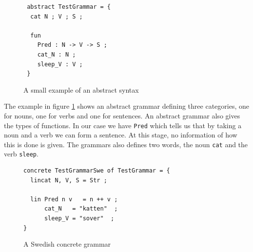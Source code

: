 \documentclass{report}
\begin{document}
\begin{figure}[h]
\begin{verbatim}
 abstract TestGrammar = {
  cat N ; V ; S ;

  fun 
    Pred : N -> V -> S ;
    cat_N : N ;
    sleep_V : V ;
 }
\end{verbatim}
\caption{A small example of an abstract syntax}
\label{fig:gfAbstract1}
\end{figure}

The example in figure \ref{fig:gfAbstract1} shows an abstract grammar defining three categories, %
one for nouns, one for verbs and one for sentences. An abstract grammar also gives
the types of functions. In our case we have \verb|Pred| which
tells us that by taking a noun and a verb we can form a sentence. At this stage, 
no information of how this is done is given. The grammars also defines two words,
the noun \verb|cat| and the verb \verb|sleep|. 

\begin{figure}[h]
\begin{verbatim}
concrete TestGrammarSwe of TestGrammar = {
  lincat N, V, S = Str ;
   
  lin Pred n v   = n ++ v ;
      cat_N   = "katten"  ;
      sleep_V = "sover"  ;
}
\end{verbatim}
\caption{A Swedish concrete grammar}
\label{fig:gfSweCnc1}
\end{figure}
\end{document}
